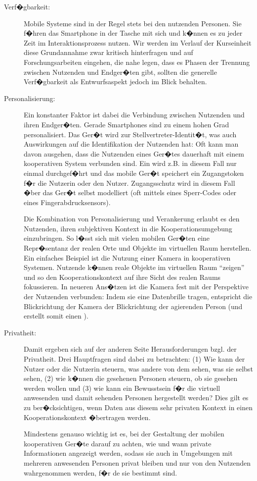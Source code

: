 \begin{description}
\item[Verf�gbarkeit:] Mobile Systeme sind in der Regel stets bei den nutzenden Personen. Sie f�hren das Smartphone in der Tasche mit sich und k�nnen es zu jeder Zeit im Interaktionsprozess nutzen. Wir werden im Verlauf der Kurseinheit diese Grundannahme zwar kritisch hinterfragen und auf Forschungsarbeiten eingehen, die nahe legen, dass es Phasen der Trennung zwischen Nutzenden und Endger�ten gibt, sollten die generelle Verf�gbarkeit als Entwurfsaspekt jedoch im Blick behalten. 


\item[Personalisierung:] Ein konstanter Faktor ist dabei die Verbindung zwischen Nutzenden und ihren Endger�ten. Gerade Smartphones sind zu einem hohen Grad personalisiert. Das Ger�t wird zur Stellvertreter-Identit�t, was auch Auswirkungen auf die Identifikation der Nutzenden hat: Oft kann man davon ausgehen, dass die Nutzenden eines Ger�tes dauerhaft mit einem kooperativen System verbunden sind. Ein  wird z.B. in diesem Fall nur einmal durchgef�hrt und das mobile Ger�t speichert ein Zugangstoken f�r die Nutzerin oder den Nutzer. Zugangsschutz wird in diesem Fall �ber das Ger�t selbst modelliert (oft mittels eines Sperr-Codes oder eines Fingerabdrucksensors).  

Die Kombination von Personalisierung und Verankerung erlaubt es den Nutzenden, ihren subjektiven Kontext in die Kooperationsumgebung einzubringen. So l�sst sich mit vielen mobilen Ger�ten eine Repr�sentanz der realen Orte und Objekte im virtuellen Raum herstellen. Ein einfaches Beispiel ist die Nutzung einer Kamera in kooperativen Systemen. Nutzende k�nnen reale Objekte im virtuellen Raum ``zeigen'' und so den Kooperationskontext auf ihre Sicht des realen Raums fokussieren. In neueren Ans�tzen ist die Kamera fest mit der Perspektive der Nutzenden verbunden: Indem sie eine Datenbrille tragen, entspricht die Blickrichtung der Kamera der Blickrichtung der agierenden Person (und erstellt somit einen ). 


\item[Privatheit:] Damit ergeben sich auf der anderen Seite Herausforderungen bzgl. der Privatheit. Drei Hauptfragen sind dabei zu betrachten: (1) Wie kann der Nutzer oder die Nutzerin  steuern, was andere von dem sehen, was sie selbst sehen, (2) wie k�nnen die gesehenen Personen steuern, ob sie gesehen werden wollen und (3) wie kann ein Bewusstsein f�r die virtuell anwesenden und damit sehenden Personen hergestellt werden? Dies gilt es zu ber�cksichtigen, wenn Daten aus diesem sehr privaten Kontext in einen Kooperationskontext �bertragen werden. 

Mindestens genauso wichtig ist es, bei der Gestaltung der mobilen kooperativen Ger�te darauf zu achten, wie und wann private Informationen angezeigt werden, sodass sie auch in Umgebungen mit mehreren anwesenden Personen privat bleiben und nur von den Nutzenden wahrgenommen werden, f�r de sie bestimmt sind.



\end{description}

